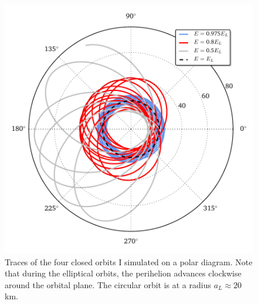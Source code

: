 \documentclass[11pt]{article}
\begin{document}
\begin{figure}[!h]
\centering
\includegraphics[scale=1]{stable_orbit/orbit_diagram.pdf}
\caption{\label{fig:trace} Traces of the four closed orbits I simulated on a polar diagram. Note that during the elliptical orbits, the perihelion advances clockwise around the orbital plane. The circular orbit is at a radius $a_L \approx 20$ km.}
\end{figure}
\end{document}
